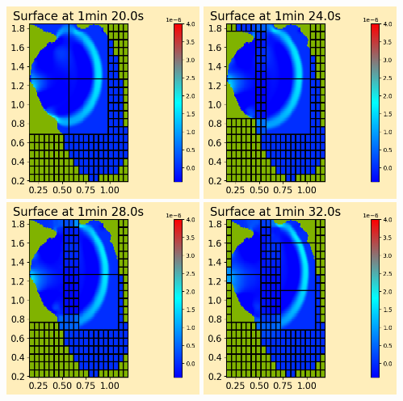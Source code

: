 \documentclass[11pt]{article}
\begin{document}
\vskip 10pt 
\includegraphics[width=0.475\textwidth]{frame0020fig0.png}
\vskip 10pt 
\includegraphics[width=0.475\textwidth]{frame0021fig0.png}
\vskip 10pt 
\includegraphics[width=0.475\textwidth]{frame0022fig0.png}
\vskip 10pt 
\includegraphics[width=0.475\textwidth]{frame0023fig0.png}
\end{document}
